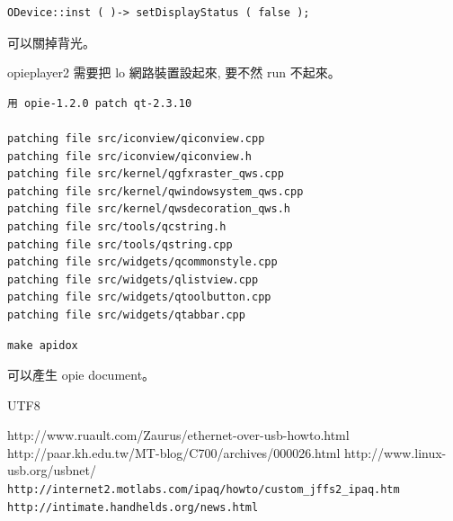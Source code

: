 \documentclass[12pt,a4paper]{article}
\begin{document}
\begin{CJK}{UTF8}{cwmu}
\begin{verbatim}
ODevice::inst ( )-> setDisplayStatus ( false );
\end{verbatim}

可以關掉背光。

opieplayer2 需要把 lo 網路裝置設起來,
要不然 run 不起來。

\begin{verbatim}
用 opie-1.2.0 patch qt-2.3.10

patching file src/iconview/qiconview.cpp
patching file src/iconview/qiconview.h
patching file src/kernel/qgfxraster_qws.cpp
patching file src/kernel/qwindowsystem_qws.cpp
patching file src/kernel/qwsdecoration_qws.h
patching file src/tools/qcstring.h
patching file src/tools/qstring.cpp
patching file src/widgets/qcommonstyle.cpp
patching file src/widgets/qlistview.cpp
patching file src/widgets/qtoolbutton.cpp
patching file src/widgets/qtabbar.cpp
\end{verbatim}


\begin{verbatim}
make apidox
\end{verbatim}

\parindent=0cm
\parskip=20pt

可以產生 opie document。
\end{CJK}{UTF8}


\begin{thebibliography}{99}
 http://www.ruault.com/Zaurus/ethernet-over-usb-howto.html
 http://paar.kh.edu.tw/MT-blog/C700/archives/000026.html
 http://www.linux-usb.org/usbnet/
 \verb+http://internet2.motlabs.com/ipaq/howto/custom_jffs2_ipaq.htm+
 \verb+http://intimate.handhelds.org/news.html+
\end{thebibliography}
  
\end{document}

